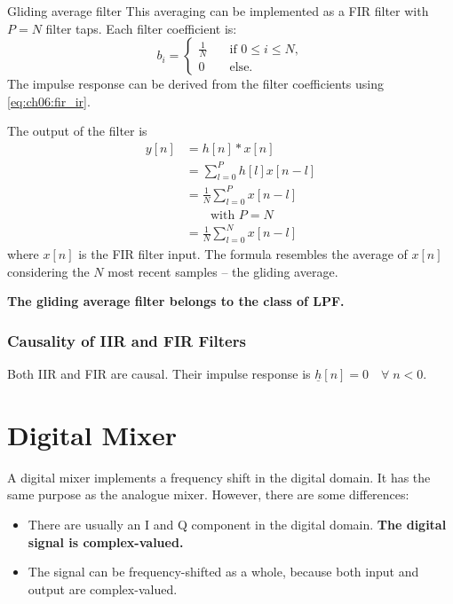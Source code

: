 \begin{refsection}
\begin{example}{Gliding average filter}
	This averaging can be implemented as a \ac{FIR} filter with $P = N$ filter taps. Each filter coefficient is:
	\begin{equation}
		b_i = \begin{cases}
			\frac{1}{N} &\quad \text{if } 0 \leq i \leq N, \\
			0 &\quad \text{else}.
		\end{cases}
	\end{equation}
	The impulse response can be derived from the filter coefficients using \eqref{eq:ch06:fir_ir}.
	
	The output of the filter is
	\begin{equation}
		\begin{split}
			y[n] &= h[n] * x[n] \\
			 &= \sum\limits_{l=0}^{P} h[l] x[n - l] \\
			 &= \frac{1}{N} \sum\limits_{l=0}^{P} x[n - l] \\
			 &\qquad \text{with } P = N \\
			 &= \frac{1}{N} \sum\limits_{l=0}^{N} x[n - l]
		\end{split}
	\end{equation}
	where $x[n]$ is the \ac{FIR} filter input. The formula resembles the average of $x[n]$ considering the $N$ most recent samples -- the gliding average.
	
	\vspace{0.5em}
	
	\textbf{The gliding average filter belongs to the class of \ac{LPF}.}
\end{example}

\subsubsection{Causality of IIR and FIR Filters}

Both \ac{IIR} and \ac{FIR} are causal. Their impulse response is $\underline{h}[n] = 0 \quad \forall \; n < 0$.

\section{Digital Mixer}

A digital mixer implements a frequency shift in the digital domain. It has the same purpose as the analogue mixer. However, there are some differences:
\begin{itemize}
	\item There are usually an \ac{I} and \ac{Q} component in the digital domain. \textbf{The digital signal is complex-valued.}
	\item The signal can be frequency-shifted as a whole, because both input and output are complex-valued.
\end{itemize}


\end{refsection}
